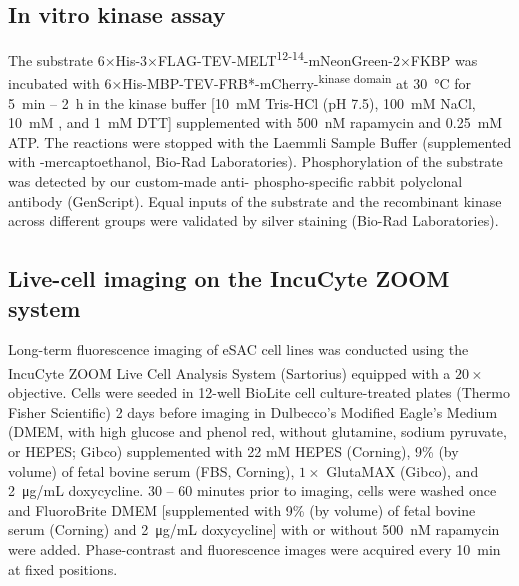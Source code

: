 \subsection{In vitro kinase assay}
The substrate 6×His-3×FLAG-TEV-MELT\textsuperscript{12-14}-mNeonGreen-2×FKBP was incubated with 6×His-MBP-TEV-FRB*-mCherry-\textsuperscript{kinase domain} at \SI{30}{\celsius} for \SI{5}{min} -- \SI{2}{h} in the kinase buffer [\SI{10}{mM} Tris-HCl (pH 7.5), \SI{100}{mM} NaCl, \SI{10}{mM} , and \SI{1}{mM} DTT] supplemented with \SI{500}{nM} rapamycin and \SI{0.25}{mM} ATP. The reactions were stopped with the Laemmli Sample Buffer (supplemented with \textbeta-mercaptoethanol, Bio-Rad Laboratories). Phosphorylation of the substrate was detected by our custom-made anti- phospho-specific rabbit polyclonal antibody (GenScript). Equal inputs of the substrate and the recombinant kinase across different groups were validated by silver staining (Bio-Rad Laboratories).

\subsection{Live-cell imaging on the IncuCyte\textsuperscript{\textregistered} ZOOM system}
Long-term fluorescence imaging of eSAC cell lines was conducted using the IncuCyte\textsuperscript{\textregistered} ZOOM Live Cell Analysis System (Sartorius) equipped with a $20\times$ objective. Cells were seeded in 12-well BioLite cell culture-treated plates (Thermo Fisher Scientific) 2 days before imaging in Dulbecco's Modified Eagle's Medium (DMEM, with high glucose and phenol red, without glutamine, sodium pyruvate, or HEPES; Gibco) supplemented with 22 mM HEPES (Corning), 9\% (by volume) of fetal bovine serum (FBS, Corning), $1\times$ GlutaMAX (Gibco), and \SI{2}{\micro g/mL} doxycycline. 30 -- 60 minutes prior to imaging, cells were washed once and FluoroBrite\texttrademark{} DMEM [supplemented with 9\% (by volume) of fetal bovine serum (Corning) and \SI{2}{\micro g/mL} doxycycline] with or without \SI{500}{nM} rapamycin were added. Phase-contrast and fluorescence images were acquired every \SI{10}{min} at fixed positions.%